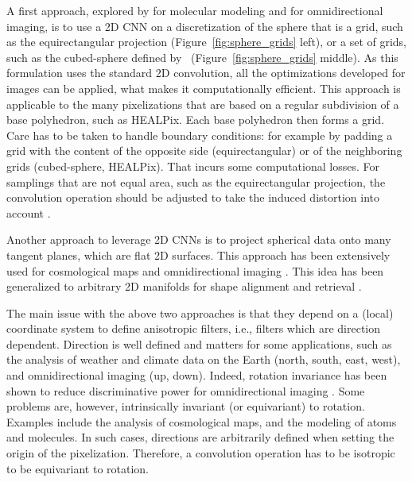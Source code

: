 \documentclass[final,twocolumn,3p,times,sort&compress]{elsarticle}
\newcommand{\figref}[1]{Figure~\ref{fig:#1}}
\newcommand{\1}{\b{1}}              %
\newcommand{\0}{\b{0}}              %
\begin{document}
A first approach, explored by \citep{boomsma2017spherical} for molecular modeling and \citep{su2017sphericalconv, coors2018spherenet} for omnidirectional imaging, is to use a 2D CNN on a discretization of the sphere that is a grid, such as the equirectangular projection (\figref{sphere_grids} left), or a set of grids, such as the cubed-sphere defined by~\citep{ronchi1996cubed} (\figref{sphere_grids} middle).
As this formulation uses the standard 2D convolution, all the optimizations developed for images can be applied, what makes it computationally efficient.
This approach is applicable to the many pixelizations that are based on a regular subdivision of a base polyhedron, such as HEALPix. Each base polyhedron then forms a grid.
Care has to be taken to handle boundary conditions: for example by padding a grid with the content of the opposite side (equirectangular) or of the neighboring grids (cubed-sphere, HEALPix). That incurs some computational losses.
For samplings that are not equal area, such as the equirectangular projection, the convolution operation should be adjusted to take the induced distortion into account \citep{su2017sphericalconv, coors2018spherenet}.

Another approach to leverage 2D CNNs is to project spherical data onto many tangent planes, which are flat 2D surfaces.
This approach has been extensively used for cosmological maps \citep{fluri2018deep, gupta2018nongaussianinformation, schmelze2017cosmologicalmodel, gillet2018deeplearning} and omnidirectional imaging \citep{xiao2012recognizing, zhang2014panocontext}.
This idea has been generalized to arbitrary 2D manifolds for shape alignment and retrieval \citep{masci2015gcnn, boscaini2016acnn, monti2017monet}.

The main issue with the above two approaches is that they depend on a (local) coordinate system to define anisotropic filters, i.e., filters which are direction dependent.
Direction is well defined and matters for some applications, such as the analysis of weather and climate data on the Earth (north, south, east, west), and omnidirectional imaging (up, down).
Indeed, rotation invariance has been shown to reduce discriminative power for omnidirectional imaging \citep{coors2018spherenet}.
Some problems are, however, intrinsically invariant (or equivariant) to rotation.
Examples include the analysis of cosmological maps, and the modeling of atoms and molecules.
In such cases, directions are arbitrarily defined when setting the origin of the pixelization.
Therefore, a convolution operation has to be isotropic to be equivariant to rotation.
\end{document}

